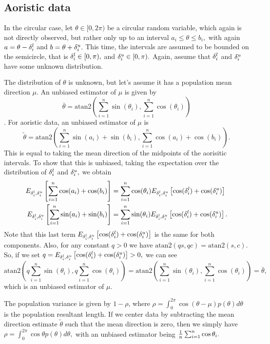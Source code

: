 \subsection{Aoristic data} \label{aoproof}

In the circular case, let $\theta \in [0, 2\pi)$ be a circular random variable, which again  is not directly observed, but rather only up to an interval $a_i \leq \theta \leq b_i,$ with again $a = \theta - {\delta^l_i}$ and $b = \theta + {\delta^u_i}.$ This time, the intervals are assumed to be bounded on the semicircle, that is ${\delta^l_i} \in [0, \pi),$ and ${\delta^u_i} \in [0, \pi).$ Again, assume that ${\delta^l_i}$ and ${\delta^u_i}$ have some unknown distribution.

The distribution of $\theta$ is unknown, but let's assume it has a population mean direction $\mu$. An unbiased estimator of $\mu$ is given by \[\bar\theta = \text{atan2}(\sum_{i=1}^n \sin(\theta_i), \sum_{i=1}^n \cos(\theta_i))\] \citep{mardia2009directional}. For aoristic data, an unbiased estimator of $\mu$ is
\begin{equation}
\tilde\theta = \text{atan2} \left( \sum_{i=1}^n \sin(a_i) + \sin(b_i), \sum_{i=1}^n \cos(a_i) + \cos(b_i) \right).
\end{equation}
This is equal to taking the mean direction of the midpoints of the aorisitic intervals. To show that this is unbiased, taking the expectation over the distribution of ${\delta^l_i}$ and ${\delta^u_i},$ we obtain
\begin{align}
E_{{\delta^l_i}, {\delta^u_i}} \left[\sum_{i=1}^n \cos(a_i) + \cos(b_i)\right] &= \sum_{i=1}^n \cos(\theta_i) E_{{\delta^l_i}, {\delta^u_i}} \left[ \cos({\delta^l_i}) + \cos({\delta^u_i}) \right] \\
E_{{\delta^l_i}, {\delta^u_i}} \left[\sum_{i=1}^n \sin(a_i) + \sin(b_i)\right] &= \sum_{i=1}^n \sin(\theta_i) E_{{\delta^l_i}, {\delta^u_i}} \left[ \cos({\delta^l_i}) + \cos({\delta^u_i}) \right].
\end{align}
Note that this last term $E_{{\delta^l_i}, {\delta^u_i}} \left[ \cos({\delta^l_i}) + \cos({\delta^u_i}) \right]$ is the same for both components. Also, for any constant $q > 0$ we have $\text{atan2}(qs, qc) = \text{atan2}(s, c).$ So, if we set $q = E_{{\delta^l_i}, {\delta^u_i}} \left[ \cos({\delta^l_i}) + \cos({\delta^u_i}) \right] > 0,$ we can see
\begin{equation}
\text{atan2}(q \sum_{i=1}^n \sin(\theta_i), q \sum_{i=1}^n \cos(\theta_i)) = \text{atan2}(\sum_{i=1}^n \sin(\theta_i), \sum_{i=1}^n \cos(\theta_i)) = \bar\theta,
\end{equation}
which is an unbiased estimator of $\mu$.

The population variance is given by $1 - \rho$, where $\rho = \int_0^{2\pi} \cos(\theta - \mu) p(\theta) d\theta$ is the population resultant length. If we center data by subtracting the mean direction estimate  $\tilde\theta$ such that the mean direction is zero, then we simply have $\rho = \int_0^{2\pi} \cos\theta p(\theta) d\theta,$ with an unbiased estimator being $\frac{1}{n}\sum_{i=1}^n \cos\theta_i.$

